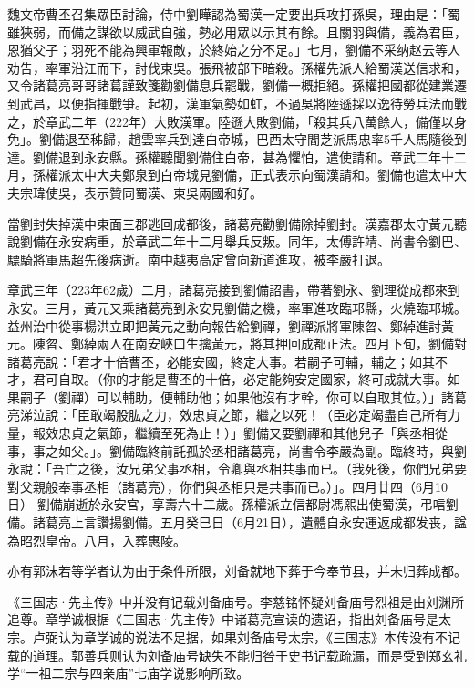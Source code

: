 魏文帝曹丕召集眾臣討論，侍中劉曄認為蜀漢一定要出兵攻打孫吳，理由是：「蜀雖狹弱，而備之謀欲以威武自強，勢必用眾以示其有餘。且關羽與備，義為君臣，恩猶父子；羽死不能為興軍報敵，於終始之分不足。」七月，劉備不采纳赵云等人劝告，率軍沿江而下，討伐東吳。張飛被部下暗殺。孫權先派人給蜀漢送信求和，又令諸葛亮哥哥諸葛謹致箋勸劉備息兵罷戰，劉備一概拒絕。孫權把國都從建業遷到武昌，以便指揮戰爭。起初，漢軍氣勢如虹，不過吳將陸遜採以逸待勞兵法而戰之，於章武二年（222年）大敗漢軍。陸遜大敗劉備，「殺其兵八萬餘人，備僅以身免」。劉備退至秭歸，趙雲率兵到達白帝城，巴西太守閻芝派馬忠率5千人馬隨後到達。劉備退到永安縣。孫權聽聞劉備住白帝，甚為懼怕，遣使請和。章武二年十二月，孫權派太中大夫鄭泉到白帝城見劉備，正式表示向蜀漢請和。劉備也遣太中大夫宗瑋使吳，表示贊同蜀漢、東吳兩國和好。

當劉封失掉漢中東面三郡逃回成都後，諸葛亮勸劉備除掉劉封。漢嘉郡太守黃元聽說劉備在永安病重，於章武二年十二月舉兵反叛。同年，太傅許靖、尚書令劉巴、驃騎將軍馬超先後病逝。南中越夷高定曾向新道進攻，被李嚴打退。

章武三年（223年62歲）二月，諸葛亮接到劉備詔書，帶著劉永、劉理從成都來到永安。三月，黃元又乘諸葛亮到永安見劉備之機，率軍進攻臨邛縣，火燒臨邛城。益州治中從事楊洪立即把黃元之動向報告給劉禪，劉禪派將軍陳曶、鄭綽進討黃元。陳曶、鄭綽兩人在南安峽口生擒黃元，將其押回成都正法。四月下旬，劉備對諸葛亮說：「君才十倍曹丕，必能安國，終定大事。若嗣子可輔，輔之；如其不才，君可自取。（你的才能是曹丕的十倍，必定能夠安定國家，終可成就大事。如果嗣子（劉禪）可以輔助，便輔助他；如果他沒有才幹，你可以自取其位。）」諸葛亮涕泣說：「臣敢竭股肱之力，效忠貞之節，繼之以死！（臣必定竭盡自己所有力量，報效忠貞之氣節，繼續至死為止！）」劉備又要劉禪和其他兒子「與丞相從事，事之如父。」。劉備臨終前託孤於丞相諸葛亮，尚書令李嚴為副。臨終時，與劉永說：「吾亡之後，汝兄弟父事丞相，令卿與丞相共事而已。（我死後，你們兄弟要對父親般奉事丞相（諸葛亮），你們與丞相只是共事而已。）」。四月廿四（6月10日） 劉備崩逝於永安宮，享壽六十二歲。孫權派立信都尉馮熙出使蜀漢，弔唁劉備。諸葛亮上言讚揚劉備。五月癸巳日（6月21日），遺體自永安運返成都发丧，諡為昭烈皇帝。八月，入葬惠陵。

亦有郭沫若等学者认为由于条件所限，刘备就地下葬于今奉节县，并未归葬成都。

《三国志·先主传》中并没有记载刘备庙号。李慈铭怀疑刘备庙号烈祖是由刘渊所追尊。章学诚根据《三国志·先主传》中诸葛亮宣读的遗诏，指出刘备庙号是太宗。卢弼认为章学诚的说法不足据，如果刘备庙号太宗，《三国志》本传没有不记载的道理。郭善兵则认为刘备庙号缺失不能归咎于史书记载疏漏，而是受到郑玄礼学“一祖二宗与四亲庙”七庙学说影响所致。

